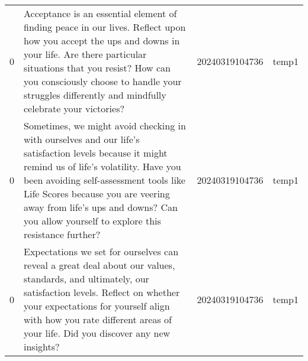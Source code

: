 \begin{longtable}{rlll}
  0 &                                                                                                                                                                                                                                                                                                                                                                                                                                                                                                                                                                                                                                                                          Acceptance is an essential element of finding peace in our lives. Reflect upon how you accept the ups and downs in your life. Are there particular situations that you resist? How can you consciously choose to handle your struggles differently and mindfully celebrate your victories? & 20240319104736 &       temp1 \\
  0 &                                                                                                                                                                                                                                                                                                                                                                                                                                                                                                                                                                                                                                           Sometimes, we might avoid checking in with ourselves and our life's satisfaction levels because it might remind us of life's volatility. Have you been avoiding self-assessment tools like Life Scores because you are veering away from life's ups and downs? Can you allow yourself to explore this resistance further? & 20240319104736 &       temp1 \\
  0 &                                                                                                                                                                                                                                                                                                                                                                                                                                                                                                                                                                                                                                                                                          Expectations we set for ourselves can reveal a great deal about our values, standards, and ultimately, our satisfaction levels. Reflect on whether your expectations for yourself align with how you rate different areas of your life. Did you discover any new insights? & 20240319104736 &       temp1 \\

\end{longtable}
